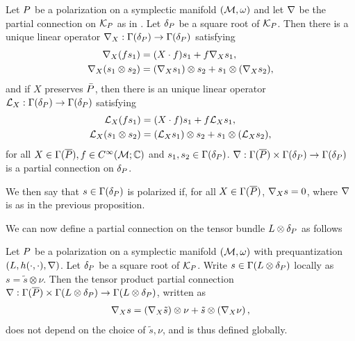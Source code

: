 \documentclass[notas.tex]{subfiles}
\begin{document}
\begin{prop}
	Let $P$ be a polarization on a symplectic manifold $(\mathcal{M}, \omega)$ and let $\nabla$ be the partial connection on $\mathcal{K}_P$ as in . Let $\delta_P$ be a square root of $\mathcal{K}_P$. Then there is a unique linear operator $\nabla_{X}:\Gamma(\delta_P) \to \Gamma(\delta_P)$ satisfying
	\begin{align*}
		\nabla_{X}(fs_1) &= (X \cdot f) s_1 + f \nabla_{X} s_1, \\
		\nabla_{X}(s_1\otimes s_2) &= (\nabla_{X}s_1)\otimes s_2 + s_1 \otimes (\nabla_{X} s_2), 
	\end{align*}
	and if $X$ preserves $\bar {P}$, then there is an unique linear operator $\mathcal{L}_{X}:\Gamma(\delta_P) \to \Gamma(\delta_P)$ satisfying 
	\begin{align*}
		\mathcal{L}_{X}(fs_1) &= (X \cdot f) s_1 + f \mathcal{L}_{X} s_1, \\
		\mathcal{L}_{X}(s_1\otimes s_2) &= (\mathcal{L}_{X}s_1)\otimes s_2 + s_1 \otimes (\mathcal{L}_{X} s_2),
	\end{align*}
	for all $X \in \Gamma(\overline {P}), f \in C^\infty(\mathcal{M};\mathbb{C})$ and $s_1, s_2 \in \Gamma(\delta_P)$.
	$\nabla:\Gamma(\overline {P})\times\Gamma(\delta_P) \to \Gamma(\delta_P)$ is a partial connection on $\delta_P$.
\end{prop}
We then say that $s \in \Gamma(\delta_P)$ is polarized if, for all $X \in \Gamma(\overline{P})$, $\nabla_{X} s = 0$, where $\nabla$ is as in the previous proposition.

We can now define a partial connection on the tensor bundle $L \otimes \delta_P$ as follows

\begin{prop}
	Let $P$ be a polarization on a symplectic manifold $(\mathcal{M},\omega)$ with prequantization $(L, h(\cdot,\cdot), \nabla)$. Let $\delta_P$ be a square root of $\mathcal{K}_P$. Write $s \in \Gamma(L\otimes \delta_P)$ locally as $s = \tilde s \otimes \nu$. Then the tensor product partial connection $\nabla : \Gamma(\overline {P}) \times \Gamma(L \otimes \delta_P) \to \Gamma(L \otimes \delta_P)$, written as
	\begin{align} \label{eq_tensor_connection}
		\nabla_{X} s= \left (\nabla_{X} \tilde s \right ) \otimes \nu +  \tilde s \otimes \left (\nabla_{X}\nu \right ),
	\end{align}
	does not depend on the choice of $\tilde s,\nu$, and is thus defined globally.
\end{prop}
\end{document}
